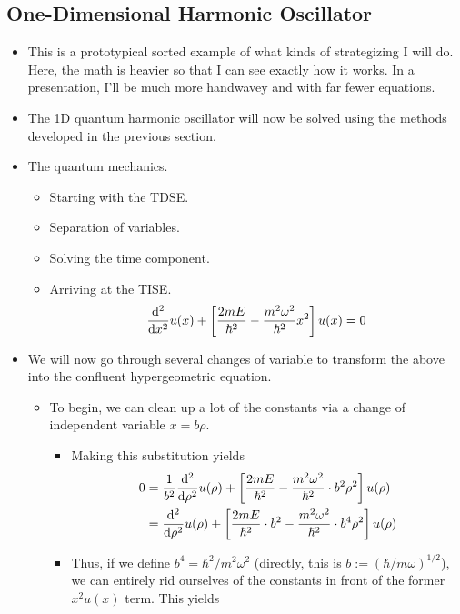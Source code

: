 \documentclass[../finalProject.tex]{subfiles}
\begin{document}
\subsection*{One-Dimensional Harmonic Oscillator}
\begin{itemize}
    \item This is a prototypical sorted example of what kinds of strategizing I will do. Here, the math is heavier so that I can see exactly how it works. In a presentation, I'll be much more handwavey and with far fewer equations.
    \item The 1D quantum harmonic oscillator will now be solved using the methods developed in the previous section.
    \item The quantum mechanics.
    \begin{itemize}
        \item Starting with the TDSE.
        \item Separation of variables.
        \item Solving the time component.
        \item Arriving at the TISE.
        \begin{equation*}
            \dv[2]{x}u(x)+\left[ \frac{2mE}{\hbar^2}-\frac{m^2\omega^2}{\hbar^2}x^2 \right]u(x) = 0
        \end{equation*}
    \end{itemize}
    \item We will now go through several changes of variable to transform the above into the confluent hypergeometric equation.
    \begin{itemize}
        \item To begin, we can clean up a lot of the constants via a change of independent variable $x=b\rho$.
        \begin{itemize}
            \item Making this substitution yields
            \begin{align*}
                0 &= \frac{1}{b^2}\dv[2]{\rho}u(\rho)+\left[ \frac{2mE}{\hbar^2}-\frac{m^2\omega^2}{\hbar^2}\cdot b^2\rho^2 \right]u(\rho)\\
                &= \dv[2]{\rho}u(\rho)+\left[ \frac{2mE}{\hbar^2}\cdot b^2-\frac{m^2\omega^2}{\hbar^2}\cdot b^4\rho^2 \right]u(\rho)
            \end{align*}
            \item Thus, if we define $b^4=\hbar^2/m^2\omega^2$ (directly, this is $b:=(\hbar/m\omega)^{1/2}$), we can entirely rid ourselves of the constants in front of the former $x^2u(x)$ term. This yields

\end{itemize}
\end{itemize}
\end{itemize}
\end{document}

